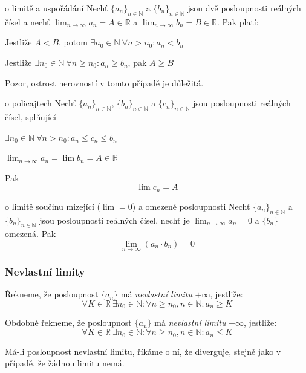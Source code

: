 \begin{vetaN}{o limitě a uspořádání}
Nechť $\{a_n\}_{n \in \mathbb{N}}$ a $\{b_n\}_{n \in \mathbb{N}}$ jsou dvě posloupnosti reálných čísel a nechť $\lim_{n \rightarrow \infty} a_n = A \in \mathbb{R}$ a $\lim_{n \rightarrow \infty} b_n = B \in \mathbb{R}$. Pak platí:
\begin{penumerate}
	\item Jestliže $A < B$, potom $\exists n_0 \in \mathbb{N}\ \forall n > n_0: a_n < b_n$
	\item Jestliže $\exists n_0 \in \mathbb{N}\ \forall n \ge n_0: a_n \ge b_n$, pak $A \ge B$
\end{penumerate}

\noindent Pozor, ostrost nerovností v tomto případě je důležitá.
\end{vetaN}

\begin{vetaN}{o policajtech}
Nechť $\{a_n\}_{n \in \mathbb{N}}$, $\{b_n\}_{n \in \mathbb{N}}$ a $\{c_n\}_{n \in \mathbb{N}}$ jsou posloupnosti reálných čísel, splňující
\begin{penumerate}
	\item $\exists n_0 \in \mathbb{N}\ \forall n > n_0: a_n \le c_n \le b_n$
	\item $\lim_{n \rightarrow \infty}a_n = \lim b_n = A \in \mathbb{R}$
\end{penumerate}
Pak
$$
\lim c_n = A
$$
\end{vetaN}

\begin{vetaN}{o limitě součinu mizející ($\lim=0$) a omezené posloupnosti}
Nechť $\{a_n\}_{n \in \mathbb{N}}$ a $\{b_n\}_{n \in \mathbb{N}}$ jsou posloupnosti reálných čísel, nechť je $\lim_{n \rightarrow \infty} a_n = 0$ a $\{b_n\}$ omezená. Pak
$$
\lim_{n \rightarrow \infty}(a_n \cdot b_n) = 0
$$
\end{vetaN}

\subsubsection{Nevlastní limity}
\begin{definice}
Řekneme, že posloupnost  $\{a_n\}$ má \emph{nevlastní limitu} $+ \infty$, jestliže:
$$ \forall K \in \mathbb{R}\ \exists n_0 \in \mathbb{N}: \forall n \ge n_0, n \in \mathbb{N}: a_n \ge K $$

Obdobně řekneme, že posloupnost  $\{a_n\}$ má \emph{nevlastní limitu} $- \infty$, jestliže:
$$ \forall K \in \mathbb{R}\ \exists n_0 \in \mathbb{N}: \forall n \ge n_0, n \in \mathbb{N}: a_n \le K $$

Má-li posloupnost nevlastní limitu, říkáme o ní, že diverguje, stejně jako v případě, že žádnou limitu nemá.
\end{definice}

